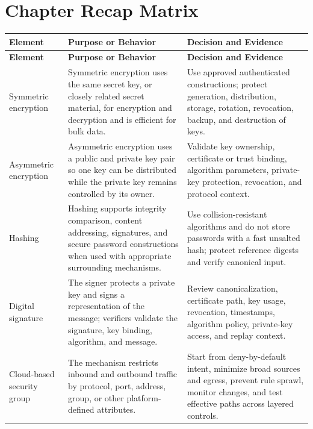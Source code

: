 \documentclass[11pt]{article}
\begin{document}
\section{Chapter Recap Matrix}
\begingroup\small\setlength{\tabcolsep}{4pt}
\begin{longtable}{@{}>{\RaggedRight\arraybackslash}p{}>{\RaggedRight\arraybackslash}p{}>{\RaggedRight\arraybackslash}p{}@{}}
\toprule\rowcolor{Navy}\color{white}\textbf{Element} & \color{white}\textbf{Purpose or Behavior} & \color{white}\textbf{Decision and Evidence}\\\midrule\endfirsthead
\toprule\rowcolor{Navy}\color{white}\textbf{Element} & \color{white}\textbf{Purpose or Behavior} & \color{white}\textbf{Decision and Evidence}\\\midrule\endhead
Symmetric encryption & Symmetric encryption uses the same secret key, or closely related secret material, for encryption and decryption and is efficient for bulk data. & Use approved authenticated constructions; protect generation, distribution, storage, rotation, revocation, backup, and destruction of keys. \\\midrule
Asymmetric encryption & Asymmetric encryption uses a public and private key pair so one key can be distributed while the private key remains controlled by its owner. & Validate key ownership, certificate or trust binding, algorithm parameters, private-key protection, revocation, and protocol context. \\\midrule
Hashing & Hashing supports integrity comparison, content addressing, signatures, and secure password constructions when used with appropriate surrounding mechanisms. & Use collision-resistant algorithms and do not store passwords with a fast unsalted hash; protect reference digests and verify canonical input. \\\midrule
Digital signature & The signer protects a private key and signs a representation of the message; verifiers validate the signature, key binding, algorithm, and message. & Review canonicalization, certificate path, key usage, revocation, timestamps, algorithm policy, private-key access, and replay context. \\\midrule
Cloud-based security group & The mechanism restricts inbound and outbound traffic by protocol, port, address, group, or other platform-defined attributes. & Start from deny-by-default intent, minimize broad sources and egress, prevent rule sprawl, monitor changes, and test effective paths across layered controls. \\\midrule

\end{longtable}
\end{document}
